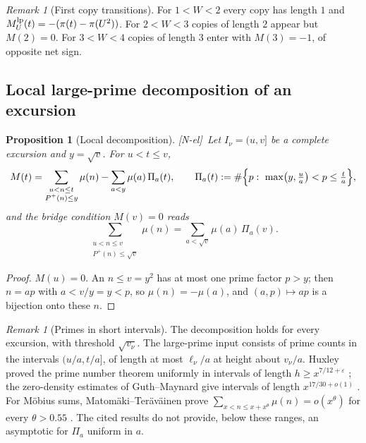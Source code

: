 \documentclass[11pt]{amsart}
\numberwithin{equation}{section}
\theoremstyle{plain}
\newtheorem{proposition}[theorem]{Proposition}
\theoremstyle{definition}
\theoremstyle{remark}
\newtheorem{remark}[theorem]{Remark}
\newcommand{\eps}{\varepsilon}
\newcommand{\Pp}{P^{+}}
\newcommand{\tagNE}{\textup{[N-el]}}
\begin{document}
\begin{remark}[First copy transitions]
\label{rem:first-copy-transitions}
For $1<W<2$ every copy has length $1$ and $M^{\rm lp}_U(t)=-(\pi(t)-\pi(U^2))$. For
$2<W<3$ copies of length $2$ appear but $M(2)=0$. For $3<W<4$ copies of
length $3$ enter with $M(3)=-1$, of opposite net sign.
\end{remark}


\subsection{Local large-prime decomposition of an excursion}
\label{sec:local_large_prime}

\begin{proposition}[Local decomposition]
\label{prop:local_large_prime}
\tagNE\ Let $I_\nu=(u,v]$ be a complete excursion and $y=\sqrt v$. For $u<t\le v$,
\begin{equation}
\label{eq:local_split}
  M(t)=\sum_{\substack{u<n\le t\\ \Pp(n)\le y}}\mu(n)
  -\sum_{a<y}\mu(a)\,\Pi_a(t),\qquad
  \Pi_a(t):=\#\Bigl\{p:\ \max\bigl(y,\tfrac ua\bigr)<p\le\tfrac ta\Bigr\},
\end{equation}
and the bridge condition $M(v)=0$ reads
\begin{equation}
\label{eq:local_bridge}
  \sum_{\substack{u<n\le v\\ \Pp(n)\le\sqrt v}}\mu(n)
  =\sum_{a<\sqrt v}\mu(a)\,\Pi_a(v).
\end{equation}
\end{proposition}

\begin{proof}
$M(u)=0$. An $n\le v=y^2$ has at most one prime factor $p>y$; then
$n=ap$ with $a<v/y=y<p$, so $\mu(n)=-\mu(a)$, and $(a,p)\mapsto ap$ is a
bijection onto these $n$.
\end{proof}

\begin{remark}[Primes in short intervals]
\label{rem:local_meaning}
The decomposition holds for every excursion, with threshold $\sqrt{v_\nu}$.
The large-prime input consists of prime counts in the intervals
$(u/a,t/a]$, of length at most $\ell_\nu/a$ at height about $v_\nu/a$.
Huxley proved the prime number theorem uniformly in intervals of length
$h\ge x^{7/12+\eps}$ \cite{Huxley1972}; the zero-density estimates of
Guth--Maynard give intervals of length $x^{17/30+o(1)}$
\cite{GuthMaynard2026}. For M\"obius sums, Matom\"aki--Ter\"av\"ainen prove
$\sum_{x<n\le x+x^\theta}\mu(n)=o(x^\theta)$ for every $\theta>0.55$
\cite{MatomakiTeravainen2023}. The cited results do not provide, below these ranges, an asymptotic for
$\Pi_a$ uniform in $a$.
\end{remark}
\end{document}
